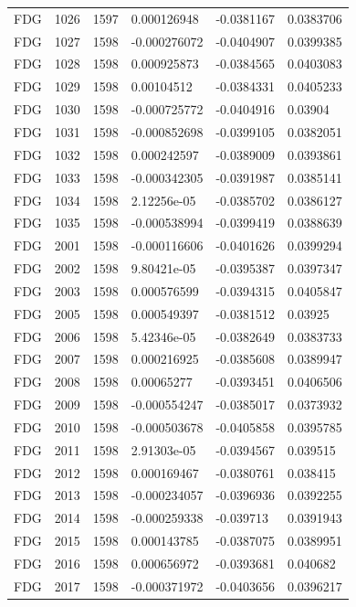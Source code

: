 \begin{longtable}{llllll}
FDG & 1026 & 1597 & 0.000126948 & -0.0381167 & 0.0383706 \\
FDG & 1027 & 1598 & -0.000276072 & -0.0404907 & 0.0399385 \\
FDG & 1028 & 1598 & 0.000925873 & -0.0384565 & 0.0403083 \\
FDG & 1029 & 1598 & 0.00104512 & -0.0384331 & 0.0405233 \\
FDG & 1030 & 1598 & -0.000725772 & -0.0404916 & 0.03904 \\
FDG & 1031 & 1598 & -0.000852698 & -0.0399105 & 0.0382051 \\
FDG & 1032 & 1598 & 0.000242597 & -0.0389009 & 0.0393861 \\
FDG & 1033 & 1598 & -0.000342305 & -0.0391987 & 0.0385141 \\
FDG & 1034 & 1598 & 2.12256e-05 & -0.0385702 & 0.0386127 \\
FDG & 1035 & 1598 & -0.000538994 & -0.0399419 & 0.0388639 \\
FDG & 2001 & 1598 & -0.000116606 & -0.0401626 & 0.0399294 \\
FDG & 2002 & 1598 & 9.80421e-05 & -0.0395387 & 0.0397347 \\
FDG & 2003 & 1598 & 0.000576599 & -0.0394315 & 0.0405847 \\
FDG & 2005 & 1598 & 0.000549397 & -0.0381512 & 0.03925 \\
FDG & 2006 & 1598 & 5.42346e-05 & -0.0382649 & 0.0383733 \\
FDG & 2007 & 1598 & 0.000216925 & -0.0385608 & 0.0389947 \\
FDG & 2008 & 1598 & 0.00065277 & -0.0393451 & 0.0406506 \\
FDG & 2009 & 1598 & -0.000554247 & -0.0385017 & 0.0373932 \\
FDG & 2010 & 1598 & -0.000503678 & -0.0405858 & 0.0395785 \\
FDG & 2011 & 1598 & 2.91303e-05 & -0.0394567 & 0.039515 \\
FDG & 2012 & 1598 & 0.000169467 & -0.0380761 & 0.038415 \\
FDG & 2013 & 1598 & -0.000234057 & -0.0396936 & 0.0392255 \\
FDG & 2014 & 1598 & -0.000259338 & -0.039713 & 0.0391943 \\
FDG & 2015 & 1598 & 0.000143785 & -0.0387075 & 0.0389951 \\
FDG & 2016 & 1598 & 0.000656972 & -0.0393681 & 0.040682 \\
FDG & 2017 & 1598 & -0.000371972 & -0.0403656 & 0.0396217 \\

\end{longtable}
